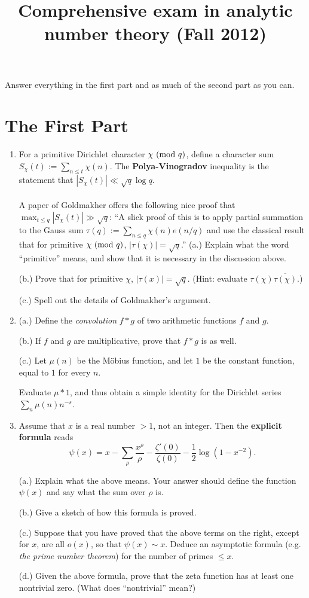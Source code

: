 \documentclass[12pt]{amsart}
\title{Comprehensive exam in analytic number theory (Fall 2012)}
\newcommand{\textmod}{{\text {\rm mod}}}
\begin{document}
\maketitle
Answer everything in the first part and as much of the second part as you can.
\section{The First Part}
\begin{enumerate}[1.]
\item
For a primitive Dirichlet character $\chi \ (\textmod \ q)$, define a character sum
$S_{\chi}(t) := \sum_{n \leq t} \chi(n).
$ The {\bf Polya-Vinogradov} inequality is the statement that
$|S_{\chi}(t)| \ll \sqrt{q} \log q.$
\\
\\
A paper of Goldmakher \cite{gold} offers the following nice proof that
$\max_{t \leq q} |S_{\chi}(t)| \gg \sqrt{q}$:
\vskip 0.1in
``A slick proof of this is to apply partial summation to the Gauss sum
$\tau(q) := \sum_{n \leq q} \chi(n) e(n/q)
$ and use the classical result that for primitive $\chi \ (\textmod \ q)$, $|\tau(\chi)| = \sqrt{q}$.''
\vskip 0.2in
(a.) Explain what the word ``primitive'' means, and show that it is necessary in the discussion above.

(b.) Prove that for primitive $\chi$, $|\tau(x)| = \sqrt{q}$. (Hint: evaluate $\tau(\chi) \overline{\tau(\chi)}$.)

(c.) Spell out the details of Goldmakher's argument.
\vskip 0.2in
\item 
(a.) Define the {\itshape convolution} $f \ast g$ of two arithmetic functions $f$ and $g$.

(b.) If $f$ and $g$ are multiplicative, prove that $f \ast g$ is as well.

(c.) Let $\mu(n)$ be the M\"obius function, and let $1$ be the constant function, equal to $1$ for every $n$. 

Evaluate $\mu \ast 1$, and thus obtain a simple identity for the Dirichlet series $\sum_n \mu(n) n^{-s}$.
\vskip 0.2in
\item
Assume that $x$ is a real number $> 1$, not an integer. Then the {\bf explicit formula} reads
$$\psi(x) = x - \sum_{\rho} \frac{x^{\rho}}{\rho} - \frac{ \zeta'(0)}{ \zeta(0)} - \frac{1}{2} \log(1 - x^{-2}).$$

(a.) Explain what the above means. Your answer should define the function $\psi(x)$ and say what the sum over $\rho$ is.

(b.) Give a sketch of how this formula is proved.

(c.) Suppose that you have proved that the above terms on the right, except for $x$, are all $o(x)$, so that
$\psi(x) \sim x$. Deduce an asymptotic formula (e.g. {\itshape the prime number theorem}) for the number of primes $\leq x$.

(d.) Given the above formula, prove that the zeta function has at least one nontrivial zero. (What does ``nontrivial'' mean?)

\end{enumerate}
\end{document}
